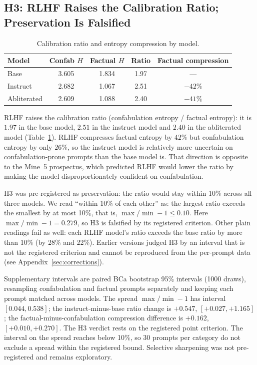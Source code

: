 \documentclass[11pt,a4paper]{article}
\begin{document}
\subsection{H3: RLHF Raises the Calibration Ratio; Preservation Is Falsified}

\begin{table}[ht]
\centering
\small
\caption{Calibration ratio and entropy compression by model.}
\label{tab:calibration}
\begin{tabular}{lcccc}
\toprule
\textbf{Model} & \textbf{Confab $H$} & \textbf{Factual $H$}
  & \textbf{Ratio} & \textbf{Factual compression} \\
\midrule
Base & 3.605 & 1.834 & 1.97 & --- \\
Instruct & 2.682 & 1.067 & 2.51 & $-42\%$ \\
Abliterated & 2.609 & 1.088 & 2.40 & $-41\%$ \\
\bottomrule
\end{tabular}
\end{table}

RLHF raises the calibration ratio (confabulation entropy / factual
entropy): it is $1.97$ in the base model, $2.51$ in the instruct model
and $2.40$ in the abliterated model (Table~\ref{tab:calibration}).
RLHF compresses factual entropy by $42\%$ but
confabulation entropy by only $26\%$, so the instruct model is
relatively more uncertain on confabulation-prone prompts than the base
model is. That direction is opposite to the Mine~5 prospectus,
which predicted RLHF would lower the ratio by making the model
disproportionately confident on confabulation.

H3 was pre-registered as preservation: the ratio would stay within
10\% across all three models. We read ``within 10\% of each other'' as:
the largest ratio exceeds the smallest by at most 10\%, that is,
$\max/\min - 1 \le 0.10$. Here $\max/\min - 1 = 0.279$, so H3 is
falsified by its registered criterion. Other plain readings fail as
well: each RLHF model's ratio exceeds the base ratio by more than 10\%
(by 28\% and 22\%). Earlier versions judged H3 by an interval that is
not the registered criterion and cannot be reproduced from the
per-prompt data (see Appendix~\ref{sec:corrections}).

Supplementary intervals are paired BCa bootstrap 95\% intervals (1000
draws), resampling confabulation and factual prompts separately and
keeping each prompt matched across models. The spread
$\max/\min - 1$ has interval $[0.044, 0.538]$; the instruct-minus-base
ratio change is $+0.547$, $[+0.027, +1.165]$; the
factual-minus-confabulation compression difference is $+0.162$,
$[+0.010, +0.270]$. The H3 verdict rests on the registered point
criterion. The interval on the spread reaches below 10\%, so 30 prompts
per category do not exclude a spread within the registered bound.
Selective sharpening was not pre-registered and remains exploratory.
\end{document}
